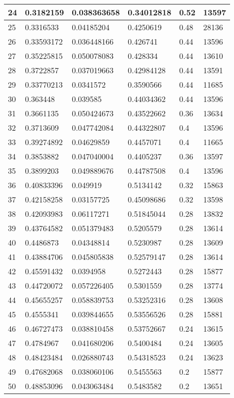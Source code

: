 \begin{longtable}{|l|l|l|l|l|l|}
24 & 0.3182159 & 0.038363658 & 0.34012818 & 0.52 & 13597 \\ \hline 
25 & 0.3316533 & 0.04185204 & 0.4250619 & 0.48 & 28136 \\ \hline 
26 & 0.33593172 & 0.036448166 & 0.426741 & 0.44 & 13596 \\ \hline 
27 & 0.35225815 & 0.050078083 & 0.428334 & 0.44 & 13610 \\ \hline 
28 & 0.3722857 & 0.037019663 & 0.42984128 & 0.44 & 13591 \\ \hline 
29 & 0.33770213 & 0.0341572 & 0.3590566 & 0.44 & 11685 \\ \hline 
30 & 0.363448 & 0.039585 & 0.44034362 & 0.44 & 13596 \\ \hline 
31 & 0.3661135 & 0.050424673 & 0.43522662 & 0.36 & 13634 \\ \hline 
32 & 0.3713609 & 0.047742084 & 0.44322807 & 0.4 & 13596 \\ \hline 
33 & 0.39274892 & 0.04629859 & 0.4457071 & 0.4 & 11665 \\ \hline 
34 & 0.3853882 & 0.047040004 & 0.4405237 & 0.36 & 13597 \\ \hline 
35 & 0.3899203 & 0.049889676 & 0.44787508 & 0.4 & 13596 \\ \hline 
36 & 0.40833396 & 0.049919 & 0.5134142 & 0.32 & 15863 \\ \hline 
37 & 0.42158258 & 0.03157725 & 0.45098686 & 0.32 & 13598 \\ \hline 
38 & 0.42093983 & 0.06117271 & 0.51845044 & 0.28 & 13832 \\ \hline 
39 & 0.43764582 & 0.051379483 & 0.5205579 & 0.28 & 13614 \\ \hline 
40 & 0.4486873 & 0.04348814 & 0.5230987 & 0.28 & 13609 \\ \hline 
41 & 0.43884706 & 0.045805838 & 0.52579147 & 0.28 & 13614 \\ \hline 
42 & 0.45591432 & 0.0394958 & 0.5272443 & 0.28 & 15877 \\ \hline 
43 & 0.44720072 & 0.057226405 & 0.5301559 & 0.28 & 13774 \\ \hline 
44 & 0.45655257 & 0.058839753 & 0.53252316 & 0.28 & 13608 \\ \hline 
45 & 0.4555341 & 0.039844655 & 0.53556526 & 0.28 & 15881 \\ \hline 
46 & 0.46727473 & 0.038810458 & 0.53752667 & 0.24 & 13615 \\ \hline 
47 & 0.4784967 & 0.041680206 & 0.5400484 & 0.24 & 13605 \\ \hline 
48 & 0.48423484 & 0.026880743 & 0.54318523 & 0.24 & 13623 \\ \hline 
49 & 0.47682068 & 0.038060106 & 0.5455563 & 0.2 & 15877 \\ \hline 
50 & 0.48853096 & 0.043063484 & 0.5483582 & 0.2 & 13651 \\ \hline 
\end{longtable}